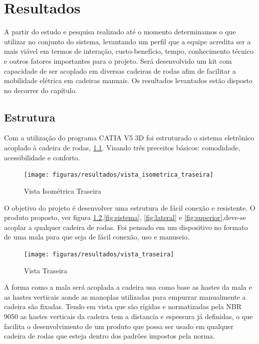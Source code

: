 \chapter[Resultados]{Resultados}

A partir do estudo e pesquisa realizado até o momento determinamos o que utilizar no conjunto do sistema, levantando um perfil que a equipe acredita ser a mais viável em termos de interação, custo-benefício, tempo, conhecimento técnico e outros fatores importantes para o projeto. Será desenvolvido um kit com capacidade de ser acoplado em diversas cadeiras de rodas afim de facilitar a mobilidade elétrica em cadeiras manuais. Os resultados levantados estão disposto no decorrer do capítulo.

\section{Estrutura}

Com a utilização do programa CATIA V5 3D foi estruturado o sistema eletrônico acoplado à cadeira de rodas, \ref{fig:vista_isometrica_traseira}. Visando três preceitos básicos: comodidade, acessibilidade e conforto.

\begin{figure}[!htb]
\centering
\texttt{[image: figuras/resultados/vista\_isometrica\_traseira]}
\caption{Vista Isométrica Traseira}
\label{fig:vista_isometrica_traseira}
\end{figure}

O objetivo do projeto é desenvolver uma estrutura de fácil conexão e resistente. O produto proposto, ver figura \ref{fig:traseira},\ref{fig:sistema}, \ref{fig:lateral} e \ref{fig:superior},deve-se acoplar a qualquer cadeira de rodas. Foi pensado em um dispositivo no formato de uma mala para que seja de fácil conexão, uso e manuseio.

\begin{figure}[!htb]
\centering
\texttt{[image: figuras/resultados/vista\_traseira]}
\caption{Vista Traseira}
\label{fig:traseira}
\end{figure}

A forma como a mala será acoplada a cadeira usa como base as hastes da mala e as hastes verticais aonde as manoplas utilizadas para empurrar manualmente a cadeira são fixadas. Tendo em vista que são rígidas e normatizadas pela NBR 9050 as hastes verticais da cadeira tem a distancia e espessura já definidas, o que facilita o desenvolvimento de um produto que possa ser usado em qualquer cadeira de rodas que esteja dentro dos padrões impostos pela norma.


